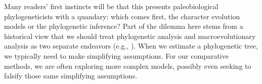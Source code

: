 \documentclass{article}
\begin{document}
Many readers’ first instincts will be that this presents paleobiological phylogeneticists with a quandary: which comes first, the character evolution models or the phylogenetic inference?  
Part of the dilemma here stems from a historical view that we should treat phylogenetic analysis and macroevolutionary analysis as two separate endeavors (e.g., \cite{Harvey1991}).  
When we estimate a phylogenetic tree, we typically need to make simplifying assumptions.
For our comparative methods, we are often exploring more complex models, possibly even seeking to falsify those same simplifying assumptions.
\end{document}
